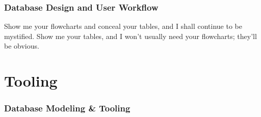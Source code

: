 \documentclass[xcolor=dvipsnames]{beamer}
\begin{document}
{
 
  \begin{frame}
    \frametitle{Database Design and User Workflow}

    \begin{displayquote}
     \LARGE Show me your flowcharts and conceal your tables, and I shall
     continue to be mystified. Show me your tables, and I won’t usually need
     your flowcharts; they’ll be obvious.
    \end{displayquote}

    \vfill
  \end{frame}
}

\section{Tooling}

{
 
  \begin{frame}
    \frametitle{Database Modeling \& Tooling}
  \end{frame}
}
    
    
\end{document}

